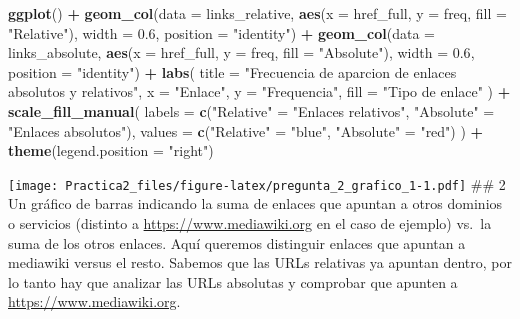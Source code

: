 \documentclass[
]{article}
\newenvironment{Shaded}{\begin{snugshade}}{\end{snugshade}}
\newcommand{\AttributeTok}[1]{\textcolor[rgb]{0.13,0.29,0.53}{#1}}
\newcommand{\FloatTok}[1]{\textcolor[rgb]{0.00,0.00,0.81}{#1}}
\newcommand{\FunctionTok}[1]{\textcolor[rgb]{0.13,0.29,0.53}{\textbf{#1}}}
\newcommand{\NormalTok}[1]{#1}
\newcommand{\OtherTok}[1]{\textcolor[rgb]{0.56,0.35,0.01}{#1}}
\newcommand{\SpecialCharTok}[1]{\textcolor[rgb]{0.81,0.36,0.00}{\textbf{#1}}}
\newcommand{\StringTok}[1]{\textcolor[rgb]{0.31,0.60,0.02}{#1}}
\begin{document}
\begin{Shaded}
\begin{Highlighting}[]
\FunctionTok{ggplot}\NormalTok{() }\SpecialCharTok{+}
  \FunctionTok{geom\_col}\NormalTok{(}\AttributeTok{data =}\NormalTok{ links\_relative, }\FunctionTok{aes}\NormalTok{(}\AttributeTok{x =}\NormalTok{ href\_full, }\AttributeTok{y =}\NormalTok{ freq, }\AttributeTok{fill =} \StringTok{"Relative"}\NormalTok{), }\AttributeTok{width =} \FloatTok{0.6}\NormalTok{, }\AttributeTok{position =} \StringTok{"identity"}\NormalTok{) }\SpecialCharTok{+}
  \FunctionTok{geom\_col}\NormalTok{(}\AttributeTok{data =}\NormalTok{ links\_absolute, }\FunctionTok{aes}\NormalTok{(}\AttributeTok{x =}\NormalTok{ href\_full, }\AttributeTok{y =}\NormalTok{ freq, }\AttributeTok{fill =} \StringTok{"Absolute"}\NormalTok{), }\AttributeTok{width =} \FloatTok{0.6}\NormalTok{, }\AttributeTok{position =} \StringTok{"identity"}\NormalTok{) }\SpecialCharTok{+}
  \FunctionTok{labs}\NormalTok{(}
    \AttributeTok{title =} \StringTok{"Frecuencia de aparcion de enlaces absolutos y relativos"}\NormalTok{,}
    \AttributeTok{x =} \StringTok{"Enlace"}\NormalTok{,}
    \AttributeTok{y =} \StringTok{"Frequencia"}\NormalTok{,}
    \AttributeTok{fill =} \StringTok{"Tipo de enlace"}
\NormalTok{  ) }\SpecialCharTok{+}
  \FunctionTok{scale\_fill\_manual}\NormalTok{(}
    \AttributeTok{labels =} \FunctionTok{c}\NormalTok{(}\StringTok{"Relative"} \OtherTok{=} \StringTok{"Enlaces relativos"}\NormalTok{, }\StringTok{"Absolute"} \OtherTok{=} \StringTok{"Enlaces absolutos"}\NormalTok{),}
    \AttributeTok{values =} \FunctionTok{c}\NormalTok{(}\StringTok{"Relative"} \OtherTok{=} \StringTok{"blue"}\NormalTok{, }\StringTok{"Absolute"} \OtherTok{=} \StringTok{"red"}\NormalTok{)}
\NormalTok{  ) }\SpecialCharTok{+}
  \FunctionTok{theme}\NormalTok{(}\AttributeTok{legend.position =} \StringTok{"right"}\NormalTok{)}
\end{Highlighting}
\end{Shaded}

\texttt{[image: Practica2\_files/figure-latex/pregunta\_2\_grafico\_1-1.pdf]}
\#\# 2 Un gráfico de barras indicando la suma de enlaces que apuntan a
otros dominios o servicios (distinto a \url{https://www.mediawiki.org}
en el caso de ejemplo) vs.~la suma de los otros enlaces. Aquí queremos
distinguir enlaces que apuntan a mediawiki versus el resto. Sabemos que
las URLs relativas ya apuntan dentro, por lo tanto hay que analizar las
URLs absolutas y comprobar que apunten a
\url{https://www.mediawiki.org}.
\end{document}
